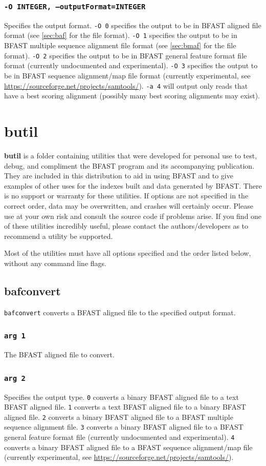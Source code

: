 \documentclass[a4paper,12pt]{book}
\newcommand{\TT}[1]{{\tt #1}} %
\newcommand{\BF}[1]{{\bf #1}} %
\newcommand{\BAF}{BFAST aligned file} %
\newcommand{\BMAF}{BFAST multiple sequence alignment file} %
\newcommand{\BGFFF}{BFAST general feature format file} %
\newcommand{\BSAMF}{BFAST sequence alignment/map file} %
\begin{document}
\subsubsection{\TT{-O INTEGER, --outputFormat=INTEGER}}
Specifies the output format.
\TT{-O 0} specifies the output to be in \BAF{} format (see \autoref{sec:baf} for the file format).
\TT{-O 1} specifies the output to be in \BMAF{} format (see \autoref{sec:bmaf} for the file format).
\TT{-O 2} specifies the output to be in \BGFFF{} format (currently undocumented and experimental).
\TT{-O 3} specifies the output to be in \BSAMF{} format (currently experimental, see \url{https://sourceforge.net/projects/samtools/}).
\TT{-a 4} will output only reads that have a best scoring alignment (possibly many best scoring alignments may exist).

\section{butil}
\label{sec:butil}
\BF{butil} is a folder containing utilities that were developed for personal use to test, debug, and compliment the BFAST program and its accompanying publication.  
They are included in this distribution to aid in using BFAST and to give examples of other uses for the indexes built and data generated by BFAST.
There is no support or warranty for these utilities.  
If options are not specified in the correct order, data may be overwritten, and crashes will certainly occur.  
Please use at your own risk and consult the source code if problems arise.  
If you find one of these utilities incredibly useful, please contact the authors/developers as to recommend a utility be supported.

Most of the utilities must have all options specified and the order listed below, without any command line flags. 

\subsection{bafconvert}
\label{sec:bafconvert}
\TT{bafconvert} converts a \BAF{} to the specified output format.
\subsubsection{\TT{arg 1}}
The \BAF{} to convert.
\subsubsection{\TT{arg 2}}
Specifies the output type.
\TT{0} converts a binary \BAF{} to a text \BAF{}.
\TT{1} converts a text \BAF{} to a binary \BAF{}.
\TT{2} converts a binary \BAF{} to a \BMAF{}.
\TT{3} converts a binary \BAF{} to a \BGFFF{} (currently undocumented and experimental).
\TT{4} converts a binary \BAF{} to a \BSAMF{} (currently experimental, see \url{https://sourceforge.net/projects/samtools/}).
\end{document}
